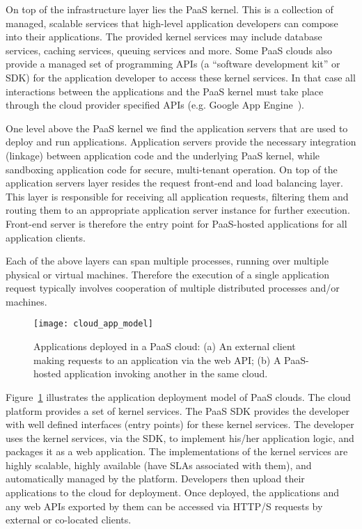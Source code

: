 On top of the infrastructure layer lies the PaaS kernel. This is a collection of managed, scalable
services that high-level application developers can compose into their applications. The provided kernel services
may include database services, caching services, queuing services and more. Some PaaS clouds
also provide a managed set of programming APIs (a ``software development
kit'' or SDK) for the application developer to access these kernel services. 
In that case all interactions between the applications and the PaaS kernel must take place through
the cloud provider specified APIs (e.g. Google App Engine~\cite{gae}). 

One level above the PaaS kernel we find the application servers that are used to deploy and run
applications. Application servers provide the necessary integration (linkage) between application code and the
underlying PaaS kernel, while sandboxing application code for secure, multi-tenant operation. On top
of the application servers layer resides the request
front-end and load balancing layer. This layer is responsible
for receiving all application requests, filtering them and routing them to an appropriate application
server instance for further execution. Front-end server is therefore the entry point for PaaS-hosted
applications for all application clients.

Each of the above layers can span multiple processes, running over multiple physical or virtual
machines. Therefore the execution of a single application request typically involves cooperation
of multiple distributed processes and/or machines.

\begin{figure}
\centering
\texttt{[image: cloud\_app\_model]}
\caption{Applications deployed in a PaaS cloud: (a) An external client making requests
to an application via the web API;
(b) A PaaS-hosted application invoking another in the same cloud.
\label{fig:cloud_app_model}
}
\vspace{-0.2in}
\end{figure}

Figure~\ref{fig:cloud_app_model} illustrates the application deployment model of PaaS clouds. 
The cloud platform provides a set of kernel services. 
The PaaS SDK provides the developer with well defined interfaces (entry points)
for these kernel services.  
The developer uses the kernel services, via the SDK, to implement his/her application logic, and packages 
it as a web application. The implementations of the kernel services
are highly scalable, highly available (have SLAs associated with them),
and automatically managed by the platform. Developers then
upload their applications to the cloud for deployment.
Once deployed, the applications and any web APIs exported by them can be accessed 
via HTTP/S requests by external or co-located clients.

